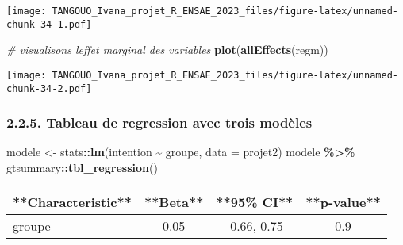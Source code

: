 \documentclass[
]{article}
\newenvironment{Shaded}{\begin{snugshade}}{\end{snugshade}}
\newcommand{\AttributeTok}[1]{\textcolor[rgb]{0.13,0.29,0.53}{#1}}
\newcommand{\CommentTok}[1]{\textcolor[rgb]{0.56,0.35,0.01}{\textit{#1}}}
\newcommand{\FunctionTok}[1]{\textcolor[rgb]{0.13,0.29,0.53}{\textbf{#1}}}
\newcommand{\NormalTok}[1]{#1}
\newcommand{\OtherTok}[1]{\textcolor[rgb]{0.56,0.35,0.01}{#1}}
\newcommand{\SpecialCharTok}[1]{\textcolor[rgb]{0.81,0.36,0.00}{\textbf{#1}}}
\begin{document}
\texttt{[image: TANGOUO\_Ivana\_projet\_R\_ENSAE\_2023\_files/figure-latex/unnamed-chunk-34-1.pdf]}

\begin{Shaded}
\begin{Highlighting}[]
\CommentTok{\# visualisons l\textquotesingle{}effet marginal des variables}
\FunctionTok{plot}\NormalTok{(}\FunctionTok{allEffects}\NormalTok{(regm))}
\end{Highlighting}
\end{Shaded}

\texttt{[image: TANGOUO\_Ivana\_projet\_R\_ENSAE\_2023\_files/figure-latex/unnamed-chunk-34-2.pdf]}

\hypertarget{tableau-de-regression-avec-trois-moduxe8les}{%
\subsubsection{2.2.5. Tableau de regression avec trois
modèles}\label{tableau-de-regression-avec-trois-moduxe8les}}

\begin{Shaded}
\begin{Highlighting}[]
\NormalTok{modele }\OtherTok{\textless{}{-}}\NormalTok{ stats}\SpecialCharTok{::}\FunctionTok{lm}\NormalTok{(intention }\SpecialCharTok{\textasciitilde{}}\NormalTok{ groupe, }\AttributeTok{data =}\NormalTok{ projet2)}
\NormalTok{modele }\SpecialCharTok{\%\textgreater{}\%}\NormalTok{ gtsummary}\SpecialCharTok{::}\FunctionTok{tbl\_regression}\NormalTok{()}
\end{Highlighting}
\end{Shaded}

\begin{tabular}{l|c|c|c}
\hline
**Characteristic** & **Beta** & **95\% CI** & **p-value**\\
\hline
groupe & 0.05 & -0.66, 0.75 & 0.9\\
\hline
\end{tabular}
\end{document}
